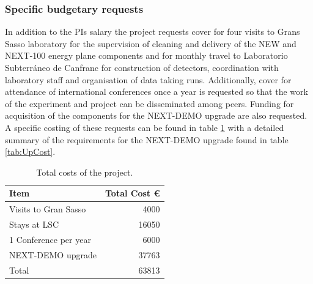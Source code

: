 \documentclass[a4paper,11pt,oneside]{article}
\begin{document}
\subsubsection*{Specific budgetary requests}
In addition to the PIs salary the project requests cover for four visits to
Grans Sasso laboratory for the supervision of cleaning and delivery of
the NEW and NEXT-100 energy plane components and for monthly travel to
Laboratorio Subterr\'aneo de Canfranc  for construction of detectors,
coordination with laboratory staff and organisation of data taking
runs. Additionally, cover for attendance of international conferences
once a year is requested so that the work of the experiment and
project can be disseminated among peers. Funding for acquisition of
the components for the NEXT-DEMO upgrade are also requested. A specific costing of these requests can be found in
table \ref{tab:TCOSTS} with a detailed summary of the requirements for
the NEXT-DEMO upgrade found in table \ref{tab:UpCost}.
\begin{table}[!h]
  \begin{center}
    \begin{tabular}{|l|r|}
      \hline
      Item              & Total Cost \euro  \\
      \hline
      Visits to Gran Sasso & 4000\\
      Stays at LSC & 16050\\
      1 Conference per year & 6000\\
      NEXT-DEMO upgrade & 37763 \\
      \hline
      Total        &  63813\\
      \hline
    \end{tabular}  
    \caption{Total costs of the project.}
    \label{tab:TCOSTS}
  \end{center}
\end{table}
\end{document}
